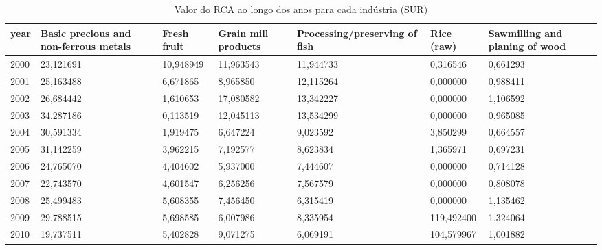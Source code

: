 \begin{table}
\centering
\caption{Valor do RCA ao longo dos anos para cada indústria (SUR)}
\begin{tabular}{p{1cm}p{2cm}p{2cm}p{2cm}p{2cm}p{2cm}p{2cm}}
\toprule
 year &  Basic precious and non-ferrous metals &  Fresh fruit &  Grain mill products &  Processing/preserving of fish &  Rice (raw) &  Sawmilling and planing of wood \\
\midrule
 2000 &                              23,121691 &    10,948949 &            11,963543 &                      11,944733 &    0,316546 &                        0,661293 \\
 2001 &                              25,163488 &     6,671865 &             8,965850 &                      12,115264 &    0,000000 &                        0,988411 \\
 2002 &                              26,684442 &     1,610653 &            17,080582 &                      13,342227 &    0,000000 &                        1,106592 \\
 2003 &                              34,287186 &     0,113519 &            12,045113 &                      13,534299 &    0,000000 &                        0,965085 \\
 2004 &                              30,591334 &     1,919475 &             6,647224 &                       9,023592 &    3,850299 &                        0,664557 \\
 2005 &                              31,142259 &     3,962215 &             7,192577 &                       8,623834 &    1,365971 &                        0,697231 \\
 2006 &                              24,765070 &     4,404602 &             5,937000 &                       7,444607 &    0,000000 &                        0,714128 \\
 2007 &                              22,743570 &     4,601547 &             6,256256 &                       7,567579 &    0,000000 &                        0,808078 \\
 2008 &                              25,499483 &     5,608355 &             7,456450 &                       6,315419 &    0,000000 &                        1,135462 \\
 2009 &                              29,788515 &     5,698585 &             6,007986 &                       8,335954 &  119,492400 &                        1,324064 \\
 2010 &                              19,737511 &     5,402828 &             9,071275 &                       6,069191 &  104,579967 &                        1,001882 \\

\end{tabular}
\end{table}
